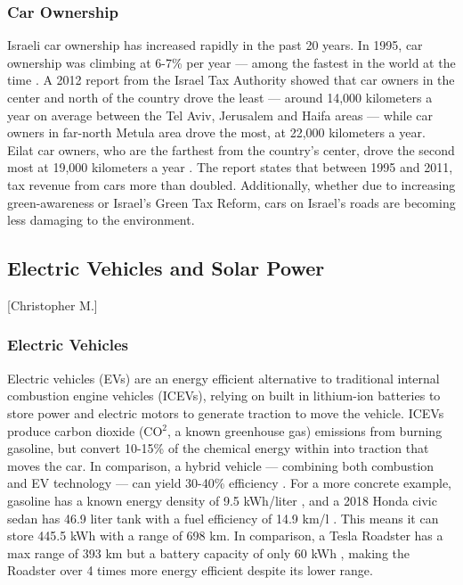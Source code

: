 \documentclass[12pt]{article}                         %
\begin{document}
\subsubsection{Car Ownership}
Israeli car ownership has increased rapidly in the past 20 years. In 1995, car ownership was climbing at 6-7\% per year --- among the fastest in the world at the time \cite{Slater1995IsraelCulture}. A 2012 report from the Israel Tax Authority showed that car owners in the center and north of the country drove the least --- around 14,000 kilometers a year on average between the Tel Aviv, Jerusalem and Haifa areas --- while car owners in far-north Metula area drove the most, at 22,000 kilometers a year. Eilat car owners, who are the farthest from the country’s center, drove the second most at 19,000 kilometers a year \cite{Schmil2012WhatHow}. The report states that between 1995 and 2011, tax revenue from cars more than doubled. Additionally, whether due to increasing green-awareness or Israel’s Green Tax Reform, cars on Israel's roads are becoming less damaging to the environment\cite{Schmil2012WhatHow}.

\subsection{Electric Vehicles and Solar Power}[Christopher M.]
\subsubsection{Electric Vehicles}
Electric vehicles (EVs) are an energy efficient alternative to traditional internal combustion engine vehicles (ICEVs), relying on built in lithium-ion batteries to store power and electric motors to generate traction to move the vehicle. ICEVs produce carbon dioxide (CO$^2$, a known greenhouse gas) emissions from burning gasoline, but convert 10-15\% of the chemical energy within into traction that moves the car. In comparison, a hybrid vehicle --- combining both combustion and EV technology --- can yield 30-40\% efficiency \cite{Zhu2015DistributedGrid}. For a more concrete example, gasoline has a known energy density of 9.5 kWh/liter \cite{EngineeringFactors}, and a 2018 Honda civic sedan has 46.9 liter tank with a fuel efficiency of 14.9 km/l \cite{20182018Information}. This means it can store 445.5 kWh with a range of 698 km. In comparison, a Tesla Roadster has a max range of 393 km but a battery capacity of only 60 kWh \cite{Friel2010ManagementVehicles}, making the Roadster over 4 times more energy efficient despite its lower range.
\end{document}
